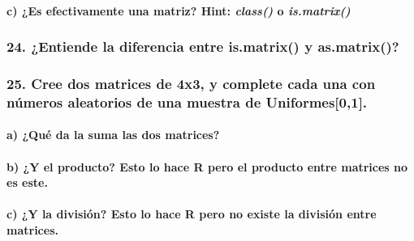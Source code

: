 \documentclass[
]{article}
\begin{document}
\hypertarget{c-es-efectivamente-una-matriz-hint-class-o-is.matrix}{%
\paragraph{\texorpdfstring{c) ¿Es efectivamente una matriz? Hint:
\emph{class()} o
\emph{is.matrix()}}{c) ¿Es efectivamente una matriz? Hint: class() o is.matrix()}}\label{c-es-efectivamente-una-matriz-hint-class-o-is.matrix}}

\hypertarget{entiende-la-diferencia-entre-is.matrix-y-as.matrix}{%
\subsubsection{24. ¿Entiende la diferencia entre is.matrix() y
as.matrix()?}\label{entiende-la-diferencia-entre-is.matrix-y-as.matrix}}

\hypertarget{cree-dos-matrices-de-4x3-y-complete-cada-una-con-nuxfameros-aleatorios-de-una-muestra-de-uniformes01.}{%
\subsubsection{25. Cree dos matrices de 4x3, y complete cada una con
números aleatorios de una muestra de
Uniformes{[}0,1{]}.}\label{cree-dos-matrices-de-4x3-y-complete-cada-una-con-nuxfameros-aleatorios-de-una-muestra-de-uniformes01.}}

\hypertarget{a-quuxe9-da-la-suma-las-dos-matrices}{%
\paragraph{a) ¿Qué da la suma las dos
matrices?}\label{a-quuxe9-da-la-suma-las-dos-matrices}}

\hypertarget{b-y-el-producto-esto-lo-hace-r-pero-el-producto-entre-matrices-no-es-este.}{%
\paragraph{b) ¿Y el producto? Esto lo hace R pero el producto entre
matrices no es
este.}\label{b-y-el-producto-esto-lo-hace-r-pero-el-producto-entre-matrices-no-es-este.}}

\hypertarget{c-y-la-divisiuxf3n-esto-lo-hace-r-pero-no-existe-la-divisiuxf3n-entre-matrices.}{%
\paragraph{c) ¿Y la división? Esto lo hace R pero no existe la división
entre
matrices.}\label{c-y-la-divisiuxf3n-esto-lo-hace-r-pero-no-existe-la-divisiuxf3n-entre-matrices.}}
\end{document}
